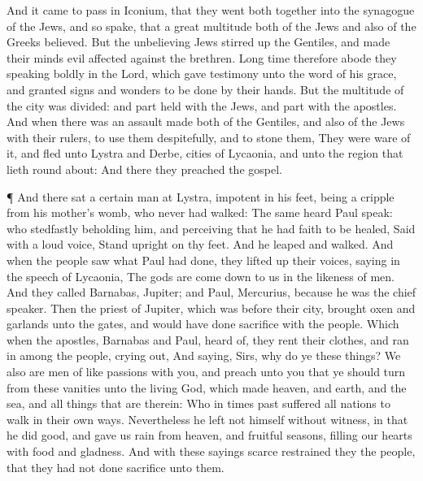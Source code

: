  And it came to pass in Iconium, that they went both
together into the synagogue of the Jews, and so spake, that a great
multitude both of the Jews and also of the Greeks believed. 
But the unbelieving Jews stirred up the Gentiles, and made their minds
evil affected against the brethren.  Long time therefore
abode they speaking boldly in the Lord, which gave testimony unto the
word of his grace, and granted signs and wonders to be done by their
hands.  But the multitude of the city was divided: and part
held with the Jews, and part with the apostles.  And when
there was an assault made both of the Gentiles, and also of the Jews
with their rulers, to use them despitefully, and to stone them,
 They were ware of it, and fled unto Lystra and Derbe,
cities of Lycaonia, and unto the region that lieth round about:
 And there they preached the gospel.

 ¶ And there sat a certain man at Lystra, impotent in his
feet, being a cripple from his mother's womb, who never had walked:
 The same heard Paul speak: who stedfastly beholding him,
and perceiving that he had faith to be healed,  Said with a
loud voice, Stand upright on thy feet. And he leaped and walked.
 And when the people saw what Paul had done, they lifted up
their voices, saying in the speech of Lycaonia, The gods are come down
to us in the likeness of men.  And they called Barnabas,
Jupiter; and Paul, Mercurius, because he was the chief speaker.
 Then the priest of Jupiter, which was before their city,
brought oxen and garlands unto the gates, and would have done sacrifice
with the people.  Which when the apostles, Barnabas and
Paul, heard of, they rent their clothes, and ran in among the people,
crying out,  And saying, Sirs, why do ye these things? We
also are men of like passions with you, and preach unto you that ye
should turn from these vanities unto the living God, which made heaven,
and earth, and the sea, and all things that are therein: 
Who in times past suffered all nations to walk in their own ways.
 Nevertheless he left not himself without witness, in that
he did good, and gave us rain from heaven, and fruitful seasons, filling
our hearts with food and gladness.  And with these sayings
scarce restrained they the people, that they had not done sacrifice unto
them.


